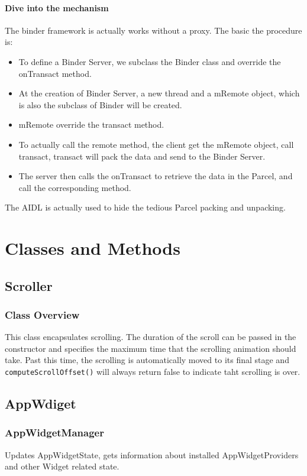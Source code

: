 \documentclass[11pt, a4paper]{book}
\begin{document}
\subsubsection{Dive into the mechanism}
The binder framework is actually works without a proxy. The basic the procedure
is:
\begin{itemize}
    \item To define a Binder Server, we subclass the Binder class and
        override the onTransact method.
    \item At the creation of Binder Server, a new thread and a mRemote
        object, which is also the subclass of Binder will be created.
    \item mRemote override the transact method.
    \item To actually call the remote method, the client get the mRemote object,
        call transact, transact will pack the data and send to the Binder
        Server. 
    \item The server then calls the onTransact to retrieve the data in the
        Parcel, and call the corresponding method.
\end{itemize}

The AIDL is actually used to hide the tedious Parcel packing and unpacking.

\chapter{Classes and Methods}
\section{Scroller}
\subsection{Class Overview}
This class encapsulates scrolling. The duration of the scroll can be passed
 in the constructor and specifies the maximum time that the scrolling animation
should take. Past this time, the scrolling is automatically moved to its final
stage and \verb|computeScrollOffset()| will always return false to indicate taht
scrolling is over.

\section{AppWdiget}

\subsection{AppWidgetManager}
Updates AppWidgetState, gets information about installed AppWidgetProviders and
other Widget related state.
\end{document}
